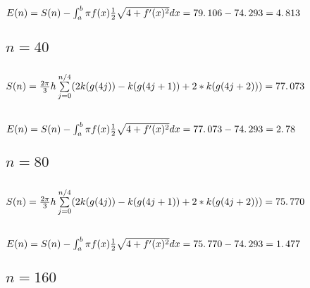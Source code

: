 \documentclass{article}
\begin{document}
\subsection{$E(n)=S(n)-\protect\int_{a}^{b}\protect\pi f(x)\frac{1}{2}%
\protect\sqrt{4+f^{\prime }(x)^{2}}dx=79.\,\allowbreak 106\allowbreak
-\allowbreak \allowbreak 74.\,\allowbreak 293=\allowbreak 4.\,\allowbreak
813 $}

\bigskip

\subsection{$n=40$}

\subsection{$S(n)=\frac{2\protect\pi }{3}h\sum%
\limits_{j=0}^{n/4}(2k(g(4j))-k(g(4j+1))+2\ast k(g(4j+2)))=\allowbreak
77.\,\allowbreak 073$}

\subsection{$E(n)=S(n)-\protect\int_{a}^{b}\protect\pi f(x)\frac{1}{2}%
\protect\sqrt{4+f^{\prime }(x)^{2}}dx=\allowbreak 77.\,\allowbreak
073\allowbreak -\allowbreak \allowbreak 74.\,\allowbreak 293=\allowbreak
2.\,\allowbreak 78$}

\bigskip

\subsection{$n=80$}

\subsection{$S(n)=\frac{2\protect\pi }{3}h\sum%
\limits_{j=0}^{n/4}(2k(g(4j))-k(g(4j+1))+2\ast k(g(4j+2)))=\allowbreak
75.\,\allowbreak 770$}

\subsection{$E(n)=S(n)-\protect\int_{a}^{b}\protect\pi f(x)\frac{1}{2}%
\protect\sqrt{4+f^{\prime }(x)^{2}}dx=\allowbreak 75.\,\allowbreak
770-\allowbreak \allowbreak 74.\,\allowbreak 293=\allowbreak 1.\,\allowbreak
477$}

\bigskip

\subsection{$n=160$}
\end{document}
